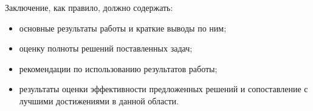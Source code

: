 \documentclass[14pt]{extreport}
\begin{document}
\conclusions

Заключение, как правило, должно содержать: 
\begin{itemize}
\item основные результаты работы и краткие выводы по ним;
\item оценку полноты решений поставленных задач;
\item рекомендации по использованию результатов работы;
\item результаты оценки эффективности предложенных решений и сопоставление с лучшими достижениями в данной области.
\end{itemize}

% 
% 
\end{document}

